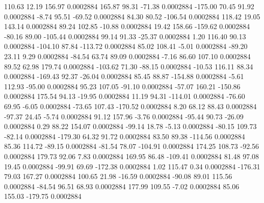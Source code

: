       110.63       12.19      156.97     0.0002884
      165.87       98.31      -71.38     0.0002884
     -175.00       70.45       91.92     0.0002884
       -8.74       95.51      -69.52     0.0002884
       84.30       80.52     -106.54     0.0002884
      118.42       19.05      143.14     0.0002884
       89.24      102.85      -10.88     0.0002884
       19.42      158.66     -159.62     0.0002884
      -80.16       89.00     -105.44     0.0002884
       99.14       91.33      -25.37     0.0002884
        1.20      116.40       90.13     0.0002884
     -104.10       87.84     -113.72     0.0002884
       85.02      108.41       -5.01     0.0002884
      -89.20       23.11        9.29     0.0002884
      -84.54       63.74       89.09     0.0002884
       -7.16       86.60      107.10     0.0002884
       89.52       62.98      179.74     0.0002884
     -103.62       71.30      -88.15     0.0002884
      -10.53      116.11       88.34     0.0002884
     -169.43       92.37      -26.04     0.0002884
       85.45       88.87     -154.88     0.0002884
       -5.61      112.93      -95.00     0.0002884
       95.23      107.05      -91.10     0.0002884
      -57.07      160.21     -150.86     0.0002884
      175.54       94.13      -19.95     0.0002884
       11.19       94.31     -114.01     0.0002884
      -76.60       69.95       -6.05     0.0002884
      -73.65      107.43     -170.52     0.0002884
        8.20       68.12       88.43     0.0002884
      -97.37       24.45       -5.74     0.0002884
       91.12      157.96       -3.76     0.0002884
      -95.44       90.73      -26.09     0.0002884
        0.29       88.22      154.07     0.0002884
      -99.14       18.78       -5.13     0.0002884
      -80.15      109.73      -82.14     0.0002884
     -179.30       64.32       91.72     0.0002884
       83.50       89.38     -114.56     0.0002884
       85.36      114.72      -89.15     0.0002884
      -81.54       78.07     -104.91     0.0002884
      174.25      108.73      -92.56     0.0002884
      179.73       92.06        7.83     0.0002884
      169.95       86.48     -109.41     0.0002884
       81.48       97.08       19.45     0.0002884
      -99.91       69.69     -172.38     0.0002884
        1.02      115.47        0.34     0.0002884
     -176.31       79.03      167.27     0.0002884
      100.65       21.98      -16.59     0.0002884
      -90.08       89.01      115.56     0.0002884
      -84.54       96.51       68.93     0.0002884
      177.99      109.55       -7.02     0.0002884
       85.06      155.03     -179.75     0.0002884
